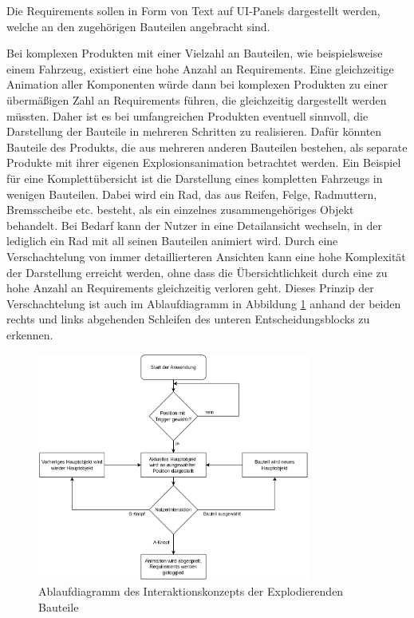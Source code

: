 Die Requirements sollen in Form von Text auf UI-Panels dargestellt werden, welche an den zugehörigen Bauteilen angebracht sind.


Bei komplexen Produkten mit einer Vielzahl an Bauteilen, wie beispielsweise einem Fahrzeug, existiert eine hohe Anzahl an Requirements.
Eine gleichzeitige Animation aller Komponenten würde dann bei komplexen Produkten zu einer übermäßigen Zahl an Requirements führen, die gleichzeitig dargestellt werden müssten.
Daher ist es bei umfangreichen Produkten eventuell sinnvoll, die Darstellung der Bauteile in mehreren Schritten zu realisieren.
Dafür könnten Bauteile des Produkts, die aus mehreren anderen Bauteilen bestehen, als separate Produkte mit ihrer eigenen Explosionsanimation betrachtet werden.
Ein Beispiel für eine Komplettübersicht ist die Darstellung eines kompletten Fahrzeugs in wenigen Bauteilen.
Dabei wird ein Rad, das aus Reifen, Felge, Radmuttern, Bremsscheibe etc. besteht, als ein einzelnes zusammengehöriges Objekt behandelt.
Bei Bedarf kann der Nutzer in eine Detailansicht wechseln, in der lediglich ein Rad mit all seinen Bauteilen animiert wird.
Durch eine Verschachtelung von immer detaillierteren Ansichten kann eine hohe Komplexität der Darstellung erreicht werden, ohne dass die Übersichtlichkeit durch eine zu hohe Anzahl an Requirements gleichzeitig verloren geht.
Dieses Prinzip der Verschachtelung ist auch im Ablaufdiagramm in Abbildung \ref{fig:explosions-ablauf} anhand der beiden rechts und links abgehenden Schleifen des unteren Entscheidungsblocks zu erkennen.

\begin{figure}[H]
  \centering
  \includegraphics[width=0.8\textwidth]{images/ExplosionAblauf.png}
  \caption{Ablaufdiagramm des Interaktionskonzepts der Explodierenden Bauteile}
  \label{fig:explosions-ablauf}
\end{figure}

